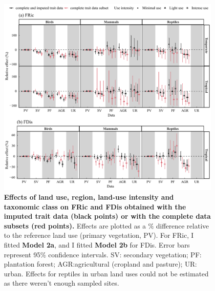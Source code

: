 \begin{figure}[h!]
\centering
\includegraphics[scale=0.7]{Supporting/Chapter3/Figures/SI_Comparison_complete}
\caption[Effects of land use, region, land-use intensity and taxonomic class on FRic and FDis obtained with the imputed trait data (black points) or with the complete data subsets (red points)]{\textbf{Effects of land use, region, land-use intensity and taxonomic class on FRic and FDis obtained with the imputed trait data (black points) or with the complete data subsets (red points).} Effects are plotted as a \% difference relative to the reference land use (primary vegetation, PV). For FRic, I fitted \textbf{Model 2a}, and I fitted \textbf{Model 2b} for FDis. Error bars represent 95\% confidence intervals. SV: secondary vegetation; PF: plantation forest; AGR:agricultural (cropland and pasture); UR: urban. Effects for reptiles in urban land uses could not be estimated as there weren’t enough sampled sites.}
\label{SI3_F23}
\end{figure}

